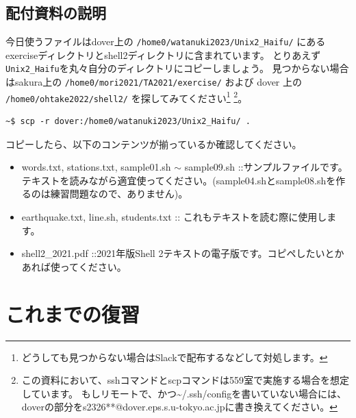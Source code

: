 \documentclass[a4j]{ltjreport}
\begin{document}
    \section*{配付資料の説明}
    今日使うファイルはdover上の \verb+/home0/watanuki2023/Unix2_Haifu/+ にある
    exerciseディレクトリとshell2ディレクトリに含まれています。
    とりあえず\verb+Unix2_Haifu+を丸々自分のディレクトリにコピーしましょう。
    見つからない場合はsakura上の \verb+/home0/mori2021/TA2021/exercise/+ および
    dover 上の \verb+/home0/ohtake2022/shell2/+ を探してみてください\footnote{どうしても見つからない場合はSlackで配布するなどして対処します。}
    \footnote{この資料において、sshコマンドとscpコマンドは559室で実施する場合を想定しています。
    もしリモートで、かつ\textasciitilde/.ssh/configを書いていない場合には、
    doverの部分をs2326**@dover.eps.s.u-tokyo.ac.jpに書き換えてください。}。
    \begin{lstlisting}[numbers=none]
    ~$ scp -r dover:/home0/watanuki2023/Unix2_Haifu/ .
    \end{lstlisting}

    コピーしたら、以下のコンテンツが揃っているか確認してください。

    \begin{itemize}
        \item words.txt, stations.txt, sample01.sh $\sim$ sample09.sh ::サンプルファイルです。テキストを読みながら適宜使ってください。(sample04.shとsample08.shを作るのは練習問題なので、ありません)。
        \item earthquake.txt, line.sh, students.txt :: これもテキストを読む際に使用します。
        \item shell2\_2021.pdf ::2021年版Shell 2テキストの電子版です。コピペしたいとかあれば使ってください。
    \end{itemize}


    \tableofcontents

    \chapter{これまでの復習}
\end{document}
